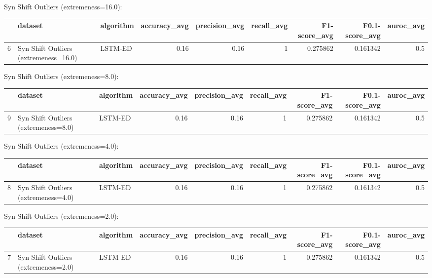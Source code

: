Syn Shift Outliers (extremeness=16.0):

\begin{tabular}{rllrrrrrr}
\hline
    & dataset                               & algorithm   &   accuracy\_avg &   precision\_avg &   recall\_avg &   F1-score\_avg &   F0.1-score\_avg &   auroc\_avg \\
\hline
  6 & Syn Shift Outliers (extremeness=16.0) & LSTM-ED     &           0.16 &            0.16 &            1 &       0.275862 &         0.161342 &         0.5 \\
\hline
\end{tabular}

Syn Shift Outliers (extremeness=8.0):

\begin{tabular}{rllrrrrrr}
\hline
    & dataset                              & algorithm   &   accuracy\_avg &   precision\_avg &   recall\_avg &   F1-score\_avg &   F0.1-score\_avg &   auroc\_avg \\
\hline
  9 & Syn Shift Outliers (extremeness=8.0) & LSTM-ED     &           0.16 &            0.16 &            1 &       0.275862 &         0.161342 &         0.5 \\
\hline
\end{tabular}

Syn Shift Outliers (extremeness=4.0):

\begin{tabular}{rllrrrrrr}
\hline
    & dataset                              & algorithm   &   accuracy\_avg &   precision\_avg &   recall\_avg &   F1-score\_avg &   F0.1-score\_avg &   auroc\_avg \\
\hline
  8 & Syn Shift Outliers (extremeness=4.0) & LSTM-ED     &           0.16 &            0.16 &            1 &       0.275862 &         0.161342 &         0.5 \\
\hline
\end{tabular}

Syn Shift Outliers (extremeness=2.0):

\begin{tabular}{rllrrrrrr}
\hline
    & dataset                              & algorithm   &   accuracy\_avg &   precision\_avg &   recall\_avg &   F1-score\_avg &   F0.1-score\_avg &   auroc\_avg \\
\hline
  7 & Syn Shift Outliers (extremeness=2.0) & LSTM-ED     &           0.16 &            0.16 &            1 &       0.275862 &         0.161342 &         0.5 \\
\hline
\end{tabular}


